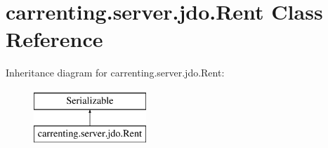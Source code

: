 \hypertarget{classcarrenting_1_1server_1_1jdo_1_1_rent}{}\section{carrenting.\+server.\+jdo.\+Rent Class Reference}
\label{classcarrenting_1_1server_1_1jdo_1_1_rent}
Inheritance diagram for carrenting.\+server.\+jdo.\+Rent\+:\begin{figure}[H]
\begin{center}
\leavevmode
\includegraphics[height=2.000000cm]{classcarrenting_1_1server_1_1jdo_1_1_rent}
\end{center}
\end{figure}
